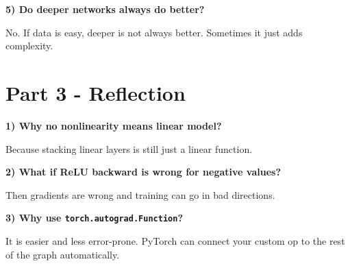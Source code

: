 \documentclass{article}
\begin{document}
\textbf{5) Do deeper networks always do better?}

No. If data is easy, deeper is not always better. Sometimes it just adds complexity.

\section*{Part 3 - Reflection}

\textbf{1) Why no nonlinearity means linear model?}

Because stacking linear layers is still just a linear function.

\textbf{2) What if ReLU backward is wrong for negative values?}

Then gradients are wrong and training can go in bad directions.

\textbf{3) Why use \texttt{torch.autograd.Function}?}

It is easier and less error-prone. PyTorch can connect your custom op to the rest of the graph automatically.
\end{document}
